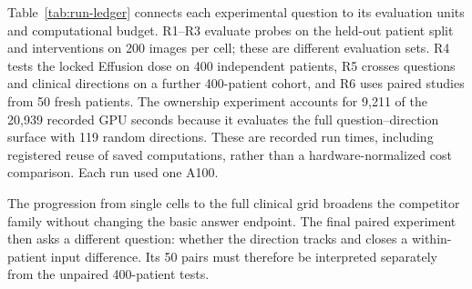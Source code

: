 Table~\ref{tab:run-ledger} connects each experimental question to its
evaluation units and computational budget. R1--R3 evaluate probes on the
held-out patient split and interventions on 200 images per cell; these are
different evaluation sets. R4 tests the locked Effusion dose on 400
independent patients, R5 crosses questions and clinical directions on a
further 400-patient cohort, and R6 uses paired studies from 50 fresh patients.
The ownership experiment accounts for 9,211 of the 20,939 recorded GPU
seconds because it evaluates the full question--direction surface with 119
random directions. These are recorded run times, including registered reuse
of saved computations, rather than a hardware-normalized cost comparison.
Each run used one A100.

\begin{table}[H]
\centering
\caption{Experimental runs and computational budgets.}
\label{tab:run-ledger}
\end{table}

The progression from single cells to the full clinical grid broadens the
competitor family without changing the basic answer endpoint. The final
paired experiment then asks a different question: whether the direction
tracks and closes a within-patient input difference. Its 50 pairs must
therefore be interpreted separately from the unpaired 400-patient tests.

